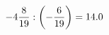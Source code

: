 \documentclass[preview]{standalone}
\begin{document}
\begin{align*}
-4 { 8 \over 19 }  :  \left( - { 6 \over 19 } \right) = 14.0
\end{align*}
\end{document}
